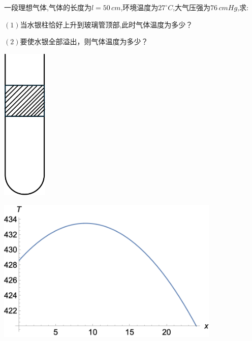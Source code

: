 \documentclass{article}
\begin{document}
一段理想气体,气体的长度为$l = 50 \, cm$,环境温度为$27 ^{\circ} C$,大气压强为$76 \, cmHg$,求:

$(1)$当水银柱恰好上升到玻璃管顶部,此时气体温度为多少？

$(2)$要使水银全部溢出，则气体温度为多少？

\vspace{1em}

\begin{minipage}{0.4\textwidth}
    \includegraphics[width = 0.16\textwidth,keepaspectratio]{./pictures/2.3-19.png}
\end{minipage}
\hfill
\begin{minipage}{0.5\textwidth}
    \includegraphics[width = 0.8\textwidth,keepaspectratio]{./pictures/2.3-20.png}
\end{minipage}
\end{document}

